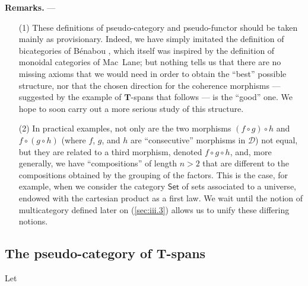 \documentclass{article}
\newenvironment{rmenv}[1]
  {\phantomsection\par\medskip\noindent\textbf{#1.}\rmfamily}
  {\par\medskip}
\newcommand{\oldpage}[1]{\marginpar{\footnotesize$\Big\vert$ \textit{p.~#1}}}
\newcommand{\TT}{\mathbf{T}}
\newcommand{\cat}[1]{\mathcal{#1}}
\newcommand{\Cat}[1]{\mathsf{#1}}
\begin{document}
\begin{rmenv}{Remarks}
  ---
  \begin{enumerate}
    \item[(1)]
      These definitions of pseudo-category and pseudo-functor should be taken mainly as provisionary.
      Indeed, we have simply imitated the definition of bicategories of Bénabou \cite{Be}, which itself was inspired by the definition of monoidal categories of Mac~Lane;
      but nothing tells us that there are no missing axioms that we would need in order to obtain the ``best'' possible structure, nor that the chosen direction for the coherence morphisms --- suggested by the example of $\TT$-spans that follows --- is the ``good'' one.
      We hope to soon carry out a more serious study of this structure.

    \item[(2)]
      In practical examples, not only are the two morphisms $(f\circ g)\circ h$ and $f\circ(g\circ h)$ (where $f$, $g$, and $h$ are ``consecutive'' morphisms in $\cat{D}$) not equal, but they are related to a third morphism, denoted $f\circ g\circ h$, and, more generally, we have ``compositions'' of length $n>2$ that are different to the compositions obtained by the grouping of the factors.
      \oldpage{248}
      This is the case, for example, when we consider the category $\Cat{Set}$ of sets associated to a universe, endowed with the cartesian product as a first law.
      We wait until the notion of multicategory defined later on (\cref{sec:iii.3}) allows us to unify these differing notions.
  \end{enumerate}
\end{rmenv}



\subsection{The pseudo-category of $\TT$-spans}
\label{sec:ii.2}

Let



\nocite{*}
\printbibliography[heading=bibintoc,title=Bibliography]
\end{document}
